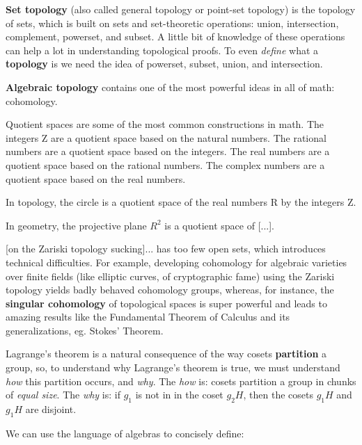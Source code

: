 {\bf Set topology} (also called general topology or point-set topology) is the topology of sets, which is built on sets and set-theoretic operations: union, intersection, complement, powerset, and subset. A little bit of knowledge of these operations can help a lot in understanding topological proofs. To even {\it define} what a {\bf topology} is we need the idea of powerset, subset, union, and intersection.

{\bf Algebraic topology} contains one of the most powerful ideas in all of math: cohomology.

\vskip8pt
Quotient spaces are some of the most common constructions in math. The integers Z are a quotient space based on the natural numbers. The rational numbers are a quotient space based on the integers. The real numbers are a quotient space based on the rational numbers. The complex numbers are a quotient space based on the real numbers.

In topology, the circle is a quotient space of the real numbers R by the integers Z.

In geometry, the projective plane $R^2$ is a quotient space of [...].

\vskip8pt
[on the Zariski topology sucking]... has too few open sets, which introduces technical difficulties. For example, developing cohomology for algebraic varieties over finite fields (like elliptic curves, of cryptographic fame) using the Zariski topology yields badly behaved cohomology groups, whereas, for instance, the {\bf singular cohomology} of topological spaces is super powerful and leads to amazing results like the Fundamental Theorem of Calculus and its generalizations, eg. Stokes' Theorem.

\vskip8pt
Lagrange's theorem is a natural consequence of the way cosets {\bf partition} a group, so, to understand why Lagrange's theorem is true, we must understand {\it how} this partition occurs, and {\it why}. The {\it how} is: cosets partition a group in chunks of {\it equal size}. The {\it why} is: if $g_1$ is not in in the coset $g_2 H$, then the cosets $g_1 H$ and $g_1 H$ are disjoint.

\vskip8pt
We can use the language of algebras to concisely define:

